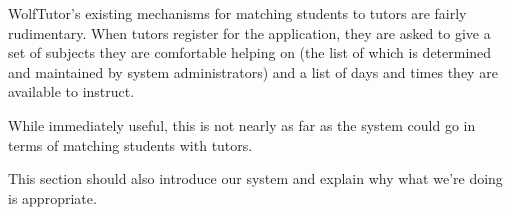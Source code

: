 WolfTutor's existing mechanisms for matching students to tutors are fairly
rudimentary.  When tutors register for the application, they are asked to give a
set of subjects they are comfortable helping on (the list of which is determined
and maintained by system administrators) and a list of days and times they are
available to instruct.  %

While immediately useful, this is not nearly as far as the system could go in
terms of matching students with tutors. 

This section should also introduce our system and explain why what we're doing
is appropriate.
